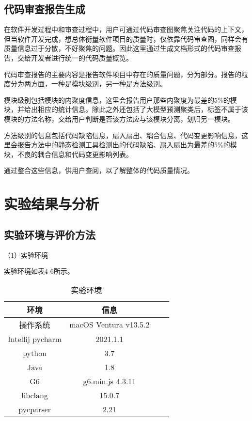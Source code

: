 \subsection{代码审查报告生成}

在软件开发过程中和审查过程中，用户可通过代码审查图聚焦关注代码的上下文，但当软件开发完成，想总体衡量软件项目的质量时，仅依靠代码审查图，同样会有质量信息过于分散，不好聚焦的问题。因此这里通过生成文档形式的代码审查报告，交给开发者进行统一的代码质量概览。

代码审查报告的主要内容是报告软件项目中存在的质量问题，分为部分。报告的粒度分为两方面，一种是模块级别，另一种是方法级别。

模块级别包括模块的内聚度信息，这里会报告用户那些内聚度为最差的5\%的模块，并给出相应的统计信息。除此之外还包括了大模型预测聚类后，标签不属于该模块的方法名称，交给用户判断是否该方法应与该模块分离，划归另一模块。

方法级别的信息包括代码缺陷信息，扇入扇出、耦合信息、代码变更影响信息，这里会报告方法中的静态检测工具检测出的代码缺陷、扇入扇出为最差的5\%的模块，不良的耦合信息和代码变更影响列表。

通过整合这些信息，供用户查阅，以了解整体的代码质量情况。

\section{实验结果与分析}

\subsection{实验环境与评价方法}
（1）实验环境

实验环境如表4-6所示。

\begin{table}[htbp]
\caption{实验环境}
\vspace{0.5em}\centering\wuhao
\begin{tabular}{cccc}
\toprule
    环境 & 信息 \\
\midrule
操作系统 & macOS Ventura v13.5.2  \\
Intellij pycharm & 2021.1.1   \\
python & 3.7   \\
Java & 1.8   \\
G6 & g6.min.js 4.3.11  \\  
libclang & 15.0.7  \\ 
pycparser & 2.21  \\
\bottomrule
\end{tabular}
\end{table}

